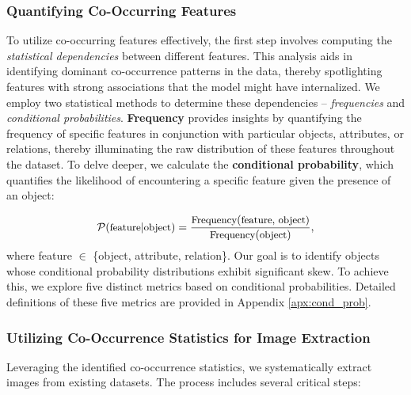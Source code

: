 \subsubsection{Quantifying Co-Occurring Features}
\label{sec:dependecies_calculation}

To utilize co-occurring features effectively, the first step involves computing the \textit{statistical dependencies} between different features. This analysis aids in identifying dominant co-occurrence patterns in the data, thereby spotlighting features with strong associations that the model might have internalized. We employ two statistical methods to determine these dependencies -- \textit{frequencies} and \textit{conditional probabilities}. \textbf{Frequency} provides insights by quantifying the frequency of specific features in conjunction with particular objects, attributes, or relations, thereby illuminating the raw distribution of these features throughout the dataset. To delve deeper, we calculate the \textbf{conditional probability}, which quantifies the likelihood of encountering a specific feature given the presence of an object:

\vspace{-5mm}
\begin{equation}
    \small
    \mathcal{P}(\text{feature}|\text{object}) = \frac{\text{Frequency}(\text{feature, object)}}{\text{Frequency}(\text{object})},
\end{equation}
where feature $\in$ \{object, attribute, relation\}. Our goal is to identify objects whose conditional probability distributions exhibit significant skew. To achieve this, we explore five distinct metrics based on conditional probabilities. Detailed definitions of these five metrics are provided in Appendix \ref{apx:cond_prob}.

\subsubsection{Utilizing Co-Occurrence Statistics for Image Extraction}
\label{sec:extraction_steps}

Leveraging the identified co-occurrence statistics, we systematically extract images from existing datasets. The process includes several critical steps:

